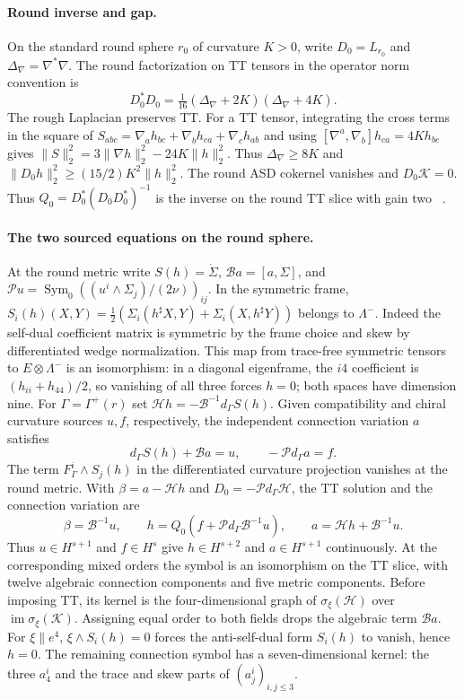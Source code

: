 \documentclass[11pt]{article}
\numberwithin{equation}{section}
\theoremstyle{definition}
\theoremstyle{remark}
\begin{document}
\paragraph{Round inverse and gap.}
On the standard round sphere \(r_0\) of curvature \(K>0\), write
\(D_0=L_{r_0}\) and \(\Delta_\nabla=\nabla^*\nabla\). The round
factorization on TT tensors in the operator norm convention is
\[
 D_0^*D_0=\tfrac1{16}(\Delta_\nabla+2K)(\Delta_\nabla+4K).
\]
The rough Laplacian preserves TT. For a TT tensor, integrating the
cross terms in the square of
\(S_{abc}=\nabla_a h_{bc}+\nabla_b h_{ca}+\nabla_c h_{ab}\)
and using \([\nabla^a,\nabla_b]h_{ca}=4Kh_{bc}\) gives
\(\|S\|_2^2=3\|\nabla h\|_2^2-24K\|h\|_2^2\).
Thus \(\Delta_\nabla\ge8K\) and
\(\|D_0h\|_2^2\ge(15/2)K^2\|h\|_2^2\).
The round ASD cokernel vanishes and \(D_0\mathcal K=0\). Thus \(Q_0=D_0^*(D_0D_0^*)^{-1}\) is the inverse on the round
TT slice with gain two~\cite[round metric Hessian and TT gap]{Baker2026ChiralMetricEvolution}
\cite[Section~1.1, round unobstructedness]{GoverGursky2024}.

\paragraph{The two sourced equations on the round sphere.}
At the round metric write \(S(h)=\dot\Sigma\), \(\mathcal B a=[a,\Sigma]\),
and \(\mathcal P u=\operatorname{Sym}_0((u^i\wedge\Sigma_j)/(2\nu))_{ij}\).
In the symmetric frame,
\(S_i(h)(X,Y)=\tfrac12(\Sigma_i(h^\sharp X,Y)+\Sigma_i(X,h^\sharp Y))\)
belongs to \(\Lambda^-\). Indeed the self-dual coefficient matrix is
symmetric by the frame choice and skew by differentiated wedge normalization.
This map from trace-free symmetric tensors to \(E\otimes\Lambda^-\)
is an isomorphism: in a diagonal eigenframe, the \(i4\) coefficient
is \((h_{ii}+h_{44})/2\), so vanishing of all three forces \(h=0\);
both spaces have dimension nine. For \(\Gamma=\Gamma^+(r)\) set
\(\mathcal Hh=-\mathcal B^{-1}d_\Gamma S(h)\).
Given compatibility and chiral curvature sources \(u,f\), respectively,
the independent connection variation \(a\) satisfies
\[
 d_\Gamma S(h)+\mathcal B a=u,\qquad -\mathcal P d_\Gamma a=f .
\]
The term \(F_\Gamma^i\wedge S_j(h)\) in the differentiated curvature
projection vanishes at the round metric. With
\(\beta=a-\mathcal Hh\) and \(D_0=-\mathcal P d_\Gamma\mathcal H\), the
TT solution and the connection variation are
\[
 \beta=\mathcal B^{-1}u,\qquad
 h=Q_0(f+\mathcal P d_\Gamma\mathcal B^{-1}u),\qquad
 a=\mathcal Hh+\mathcal B^{-1}u .
\]
Thus \(u\in H^{s+1}\) and \(f\in H^s\) give \(h\in H^{s+2}\) and
\(a\in H^{s+1}\) continuously. At the corresponding mixed orders
the symbol is an isomorphism on the TT slice, with twelve algebraic
connection components and five metric components. Before imposing TT,
its kernel is the four-dimensional graph of
\(\sigma_\xi(\mathcal H)\) over \(\operatorname{im}\sigma_\xi(\mathcal K)\).
Assigning equal order to both fields drops the algebraic term
\(\mathcal B a\). For \(\xi\parallel e^4\), \(\xi\wedge S_i(h)=0\)
forces the anti-self-dual form \(S_i(h)\) to vanish, hence \(h=0\).
The remaining connection symbol has a seven-dimensional kernel:
the three \(a^i_4\) and the trace and skew parts of \((a^i_j)_{i,j\le3}\).
\end{document}
